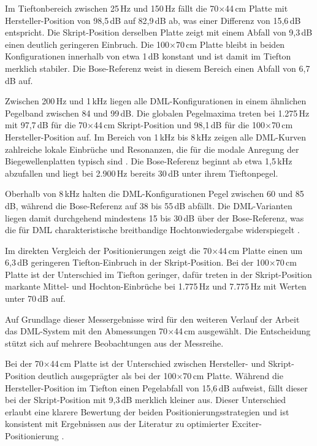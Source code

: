 Im Tieftonbereich zwischen 25\,Hz und 150\,Hz fällt die 70$\times$44\,cm Platte mit Hersteller-Position von 98,5\,dB auf 82,9\,dB ab, was einer Differenz von 15,6\,dB entspricht. Die Skript-Position derselben Platte zeigt mit einem Abfall von 9,3\,dB einen deutlich geringeren Einbruch. Die 100$\times$70\,cm Platte bleibt in beiden Konfigurationen innerhalb von etwa 1\,dB konstant und ist damit im Tiefton merklich stabiler. Die Bose-Referenz weist in diesem Bereich einen Abfall von 6,7\,dB auf.

Zwischen 200\,Hz und 1\,kHz liegen alle DML-Konfigurationen in einem ähnlichen Pegelband zwischen 84 und 99\,dB. Die globalen Pegelmaxima treten bei 1.275\,Hz mit 97,7\,dB für die 70$\times$44\,cm Skript-Position und 98,1\,dB für die 100$\times$70\,cm Hersteller-Position auf. Im Bereich von 1\,kHz bis 8\,kHz zeigen alle DML-Kurven zahlreiche lokale Einbrüche und Resonanzen, die für die modale Anregung der Biegewellenplatten typisch sind \cite{Harris2000}. Die Bose-Referenz beginnt ab etwa 1,5\,kHz abzufallen und liegt bei 2.900\,Hz bereits 30\,dB unter ihrem Tieftonpegel.

Oberhalb von 8\,kHz halten die DML-Konfigurationen Pegel zwischen 60 und 85\,dB, während die Bose-Referenz auf 38 bis 55\,dB abfällt. Die DML-Varianten liegen damit durchgehend mindestens 15 bis 30\,dB über der Bose-Referenz, was die für DML charakteristische breitbandige Hochtonwiedergabe widerspiegelt \cite{Harris2000,Bai2001}.

Im direkten Vergleich der Positionierungen zeigt die 70$\times$44\,cm Platte einen um 6,3\,dB geringeren Tiefton-Einbruch in der Skript-Position. Bei der 100$\times$70\,cm Platte ist der Unterschied im Tiefton geringer, dafür treten in der Skript-Position markante Mittel- und Hochton-Einbrüche bei 1.775\,Hz und 7.775\,Hz mit Werten unter 70\,dB auf.

Auf Grundlage dieser Messergebnisse wird für den weiteren Verlauf der Arbeit das DML-System mit den Abmessungen 70$\times$44\,cm ausgewählt. Die Entscheidung stützt sich auf mehrere Beobachtungen aus der Messreihe.


Bei der 70$\times$44\,cm Platte ist der Unterschied zwischen Hersteller- und Skript-Position deutlich ausgeprägter als bei der 100$\times$70\,cm Platte. Während die Hersteller-Position im Tiefton einen Pegelabfall von 15,6\,dB aufweist, fällt dieser bei der Skript-Position mit 9,3\,dB merklich kleiner aus. Dieser Unterschied erlaubt eine klarere Bewertung der beiden Positionierungsstrategien und ist konsistent mit Ergebnissen aus der Literatur zu optimierter Exciter-Positionierung \cite{Zenker2019,Pueo2009}.

